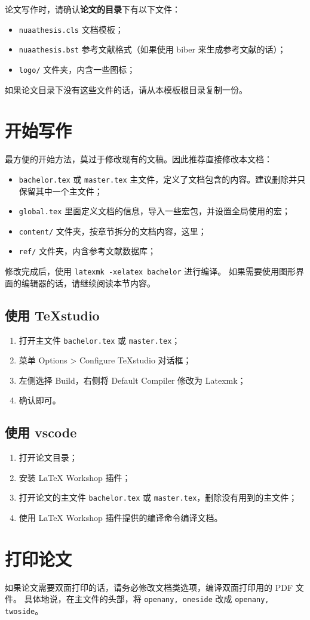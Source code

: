 论文写作时，请确认\textbf{论文的目录}下有以下文件：
\begin{itemize}
  \item \verb|nuaathesis.cls| 文档模板；
  \item \verb|nuaathesis.bst| 参考文献格式（如果使用 biber 来生成参考文献的话）；
  \item \verb|logo/| 文件夹，内含一些图标；
\end{itemize}

如果论文目录下没有这些文件的话，请从本模板根目录复制一份。

\section{开始写作}

最方便的开始方法，莫过于修改现有的文稿。因此推荐直接修改本文档：
\begin{itemize}
  \item \verb|bachelor.tex| 或 \verb|master.tex| 主文件，定义了文档包含的内容。建议删除并只保留其中一个主文件；
  \item \verb|global.tex| 里面定义文档的信息，导入一些宏包，并设置全局使用的宏；
  \item \verb|content/| 文件夹，按章节拆分的文档内容，这里；
  \item \verb|ref/| 文件夹，内含参考文献数据库；
\end{itemize}

修改完成后，使用 \verb|latexmk -xelatex bachelor| 进行编译。
如果需要使用图形界面的编辑器的话，请继续阅读本节内容。

\subsection{使用 TeXstudio}
\begin{enumerate}
\item 打开主文件 \verb|bachelor.tex| 或 \verb|master.tex|；
\item 菜单 Options > Configure TeXstudio 对话框；
\item 左侧选择 Build，右侧将 Default Compiler 修改为 Latexmk；
\item 确认即可。
\end{enumerate}

\subsection{使用 vscode}
\begin{enumerate}
\item 打开论文目录；
\item 安装 LaTeX Workshop 插件；
\item 打开论文的主文件 \verb|bachelor.tex| 或 \verb|master.tex|，删除没有用到的主文件；
\item 使用 LaTeX Workshop 插件提供的编译命令编译文档。
\end{enumerate}

\section{打印论文}

如果论文需要双面打印的话，请务必修改文档类选项，编译双面打印用的 PDF 文件。
具体地说，在主文件的头部，将 \texttt{openany, oneside} 改成 \texttt{openany, twoside}。
